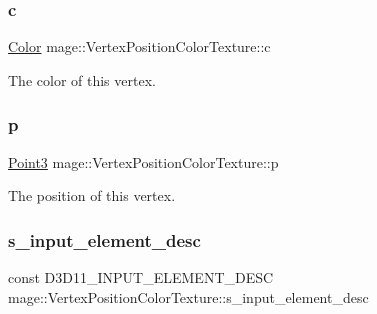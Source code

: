 \subsubsection{\texorpdfstring{c}{c}}
{\footnotesize\ttfamily \hyperlink{structmage_1_1_color}{Color} mage\+::\+Vertex\+Position\+Color\+Texture\+::c}

The color of this vertex. \hypertarget{structmage_1_1_vertex_position_color_texture_a145c2e2fce90b07252b778b46e31ea24}{}\label{structmage_1_1_vertex_position_color_texture_a145c2e2fce90b07252b778b46e31ea24} 
\subsubsection{\texorpdfstring{p}{p}}
{\footnotesize\ttfamily \hyperlink{structmage_1_1_point3}{Point3} mage\+::\+Vertex\+Position\+Color\+Texture\+::p}

The position of this vertex. \hypertarget{structmage_1_1_vertex_position_color_texture_a19df72ffa15fae0b389b9f66d7b8f3bd}{}\label{structmage_1_1_vertex_position_color_texture_a19df72ffa15fae0b389b9f66d7b8f3bd} 
\subsubsection{\texorpdfstring{s\+\_\+input\+\_\+element\+\_\+desc}{s\_input\_element\_desc}}
{\footnotesize\ttfamily const D3\+D11\+\_\+\+I\+N\+P\+U\+T\+\_\+\+E\+L\+E\+M\+E\+N\+T\+\_\+\+D\+E\+SC mage\+::\+Vertex\+Position\+Color\+Texture\+::s\+\_\+input\+\_\+element\+\_\+desc\hspace{0.3cm}{\ttfamily [static]}}

